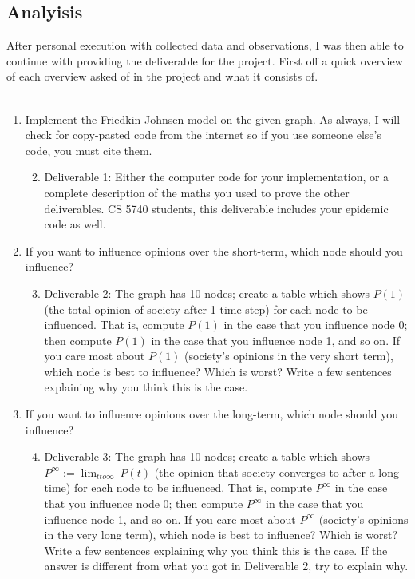 \documentclass[letterpaper]{article}
\begin{document}
\subsection{Analyisis}
After personal execution with collected data and observations, I was then able to continue with providing the deliverable for the project.  First off a quick overview of each overview asked of in the project and what it consists of.\\\\
\begin{enumerate}
	\item Implement the Friedkin-Johnsen model on the given graph. As always, I will check for copy-pasted code from the internet so if you use someone else’s code, you must cite them.
	\begin{enumerate}
		\setcounter{enumi}{1}
		\item  Deliverable 1: Either the computer code for your implementation, or a complete description of the maths you used to prove the other deliverables. CS 5740 students, this deliverable includes your epidemic code as well. 
	\end{enumerate}
	\item If you want to influence opinions over the short-term, which node should you influence?
	\begin{enumerate}
		\setcounter{enumi}{2}
		\item  Deliverable 2: The graph has 10 nodes; create a table which shows $P(1)$ (the total opinion of society after 1 time step) for each node to be influenced. That is, compute $P(1)$ in the case that you influence node 0; then compute $P(1)$ in the case that you influence node 1, and so on. If you care most about $P(1)$ (society’s opinions in the very short term), which node is best to influence? Which is worst? Write a few sentences explaining why you think this is the case.
	\end{enumerate}
	\item If you want to influence opinions over the long-term, which node should you influence?	
	\begin{enumerate}
		\setcounter{enumi}{3}
		\item Deliverable 3: The graph has 10 nodes; create a table which shows $P^\infty := \lim_{t to \infty} \ P(t)$ (the opinion that society converges to after a long time) for each node to be influenced. That is, compute $P^\infty$ in the case that you influence node 0; then compute $P^\infty$ in the case that you influence node 1, and so on. If you care most about $P^\infty$ (society’s opinions in the very long term), which node is best to influence? Which is worst? Write a few sentences explaining why you think this is the case. If the answer is different from what you got in Deliverable 2, try to explain why.\\\\
	\end{enumerate}
\end{enumerate}
\end{document}
